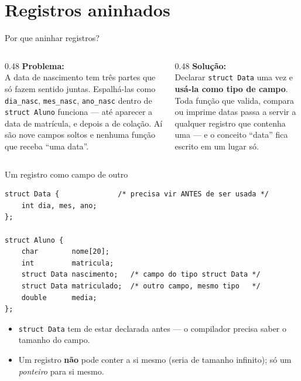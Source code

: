 \documentclass[aspectratio=169]{beamer}
\begin{document}
\section{Registros aninhados}

\begin{frame}{Por que aninhar registros?}
  \begin{columns}[T]
    \begin{column}{0.48\textwidth}
      \textbf{Problema:}\\[2mm]
      A data de nascimento tem três partes que só fazem sentido juntas.
      Espalhá-las como \texttt{dia\_nasc}, \texttt{mes\_nasc},
      \texttt{ano\_nasc} dentro de \texttt{struct Aluno} funciona --- até
      aparecer a data de matrícula, e depois a de colação. Aí são nove campos
      soltos e nenhuma função que receba ``uma data''.
    \end{column}
    \begin{column}{0.48\textwidth}
      \textbf{Solução:}\\[2mm]
      Declarar \texttt{struct Data} uma vez e \textbf{usá-la como tipo de
      campo}. Toda função que valida, compara ou imprime datas passa a servir
      a qualquer registro que contenha uma --- e o conceito ``data'' fica
      escrito em um lugar só.
    \end{column}
  \end{columns}
\end{frame}

\begin{frame}[fragile]{Um registro como campo de outro}
\begin{lstlisting}[basicstyle=\ttfamily\scriptsize]
struct Data {              /* precisa vir ANTES de ser usada */
    int dia, mes, ano;
};

struct Aluno {
    char        nome[20];
    int         matricula;
    struct Data nascimento;   /* campo do tipo struct Data */
    struct Data matriculado;  /* outro campo, mesmo tipo   */
    double      media;
};
\end{lstlisting}
  \begin{itemize}
    \item \texttt{struct Data} tem de estar declarada antes --- o compilador
      precisa saber o tamanho do campo.
    \item Um registro \textbf{não} pode conter a si mesmo (seria de tamanho
      infinito); só um \emph{ponteiro} para si mesmo.
  \end{itemize}
\end{frame}
\end{document}
